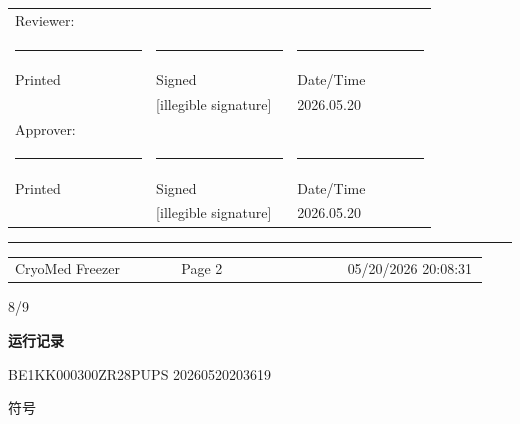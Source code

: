 \documentclass[UTF8,10pt,a4paper,fontset=fandol]{ctexart}
\newcommand{\fieldvalue}[1]{#1}
\newcommand{\handwritten}[1]{#1}
\begin{document}
\bigskip

\begin{tabular}{p{0.28\linewidth} p{0.28\linewidth} p{0.28\linewidth}}
\multicolumn{3}{l}{Reviewer:} \\[2pt]
\rule{0.9\linewidth}{0.4pt} &
\multicolumn{1}{c}{\rule{0.9\linewidth}{0.4pt}} &
\multicolumn{1}{c}{\rule{0.9\linewidth}{0.4pt}} \\
Printed & Signed & Date/Time \\[10pt]
\multicolumn{1}{l}{} &
\fieldvalue{\handwritten{[illegible signature]}} &
\fieldvalue{\handwritten{2026.05.20}} \\[4pt]
\multicolumn{3}{l}{Approver:} \\[2pt]
\rule{0.9\linewidth}{0.4pt} &
\multicolumn{1}{c}{\rule{0.9\linewidth}{0.4pt}} &
\multicolumn{1}{c}{\rule{0.9\linewidth}{0.4pt}} \\
Printed & Signed & Date/Time \\[10pt]
\multicolumn{1}{l}{} &
\fieldvalue{\handwritten{[illegible signature]}} &
\fieldvalue{\handwritten{2026.05.20}}
\end{tabular}

\vfill

\noindent\rule{\linewidth}{0.4pt}

\noindent
\begin{tabular}{p{0.33\linewidth} p{0.33\linewidth} p{0.28\linewidth}}
CryoMed Freezer & Page 2 & 05/20/2026 20:08:31
\end{tabular}

\hfill\handwritten{8/9}

\newpage

\begin{center}
\textbf{\Large 运行记录}
\end{center}

\noindent
BE1KK000300ZR28PUPS \hfill 20260520203619

\handwritten{符号}
\end{document}
